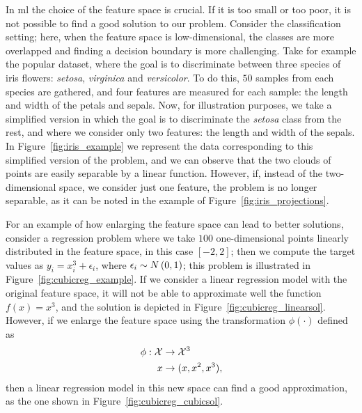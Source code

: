 In \acrshort{ml} the choice of the feature space is crucial. If it is too small or too poor, it is not possible to find a good solution to our problem.
Consider the classification setting; here, when the feature space is low-dimensional, the classes are more overlapped and finding a decision boundary is more challenging. 
%
Take for example the popular  dataset, where the goal is to discriminate between three species of iris flowers: \emph{setosa}, \emph{virginica} and \emph{versicolor}. To do this, $50$ samples from each species are gathered, and four features are measured for each sample: the length and width of the petals and sepals.
%
Now, for illustration purposes, we take a simplified version in which the goal is to discriminate the \emph{setosa} class from the rest, and where we consider only two features: the length and width of the sepals. In Figure~\ref{fig:iris_example} we represent the data corresponding to this simplified version of the  problem, and we can observe that the two clouds of points are easily separable by a linear function. However, if, instead of the two-dimensional space, we consider just one feature, the problem is no longer separable, as it can be noted in the example of Figure~\ref{fig:iris_projections}.
%

For an example of how enlarging the feature space can lead to better solutions, consider a regression problem where we take $100$ one-dimensional points linearly distributed in the feature space, in this case $[-2, 2]$; then we compute the target values as $y_i = x_i^3 + \epsilon_i$, where $\epsilon_i \sim N \left(0, 1\right)$; this problem is illustrated in Figure~\ref{fig:cubicreg_example}. If we consider a linear regression model with the original feature space, it will not be able to approximate well the function $f(x)=x^3$, and the solution is depicted in Figure~\ref{fig:cubicreg_linearsol}.
However, if we enlarge the feature space using the transformation $\phi(\cdot)$ defined as
\begin{equation}
    \begin{aligned}
        \nonumber
        \phi:\mathcal{X} &\to\mathcal{X}^3 \\
        x &\to (x, x^2, x^3) ,
    \end{aligned}
\end{equation}
then a linear regression model in this new space can find a good approximation, as the one shown in Figure~\ref{fig:cubicreg_cubicsol}.
%

